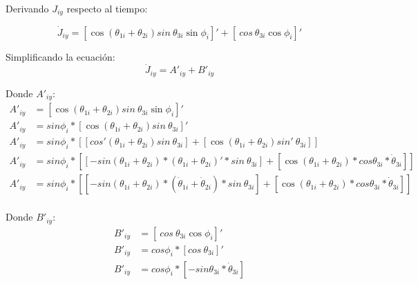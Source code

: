             
            Derivando  $J_{iy}$ respecto al tiempo:

            \begin{equation*}
                  \dot{J}_{iy}= \left[ \cos  \left(  \theta _{1i}+ \theta _{2i} \right) sin~ \theta _{3i}\sin  \phi _{i} \right] '+ \left[ ~cos~ \theta _{3i}\cos  \phi_{i} \right] ' 
            \end{equation*}
            
            Simplificando la ecuación:
            \begin{equation*}
                \dot{J}_{iy}=A'_{iy}+B'_{iy}  
            \end{equation*}
            
            Donde $A'_{iy}$:
            \begin{align*}
                 A'_{iy}&= \left[ \cos  \left(  \theta _{1i}+ \theta _{2i} \right) sin~ \theta _{3i}\sin  \phi _{i} \right] ' \\
                 A'_{iy}&=sin \phi _{i}\ast \left[ \cos  \left(  \theta _{1i}+ \theta _{2i} \right) sin~ \theta _{3i} \right] ' \\
                 A'_{iy}&=sin \phi _{i}\ast \left[  \left[ cos' \left(  \theta _{1i}+ \theta _{2i} \right) sin~ \theta _{3i} \right] + \left[ \cos  \left(  \theta _{1i}+ \theta _{2i} \right) sin'~ \theta _{3i} \right]  \right]  \\
                 A'_{iy}&=sin \phi _{i}\ast \left[  \left[ -sin \left(  \theta _{1i}+ \theta _{2i} \right) \ast \left(  \theta _{1i}+ \theta _{2i} \right) '\ast sin~ \theta _{3i} \right] + \left[ \cos  \left(  \theta _{1i}+ \theta _{2i} \right) \ast cos  \theta _{3i}\ast\dot{ \theta }_{3i} \right]  \right] \\
                 A'_{iy}&=sin \phi _{i}\ast \left[  \left[ -sin \left(  \theta _{1i}+ \theta _{2i} \right) \ast \left( \dot{ \theta }_{1i}+\dot{ \theta }_{2i} \right) \ast sin~ \theta _{3i} \right] + \left[ \cos  \left(  \theta _{1i}+ \theta _{2i} \right) \ast cos  \theta _{3i}\ast\dot{ \theta }_{3i} \right]  \right]  \\                               
            \end{align*}
            
            Donde  $B'_{iy}$:
            \begin{align*}
                 B'_{iy}&= \left[ ~cos~ \theta _{3i}\cos  \phi _{i} \right] ' \\
                 B'_{iy}&=cos \phi _{i}\ast \left[ cos~ \theta _{3i} \right] ' \\
                 B'_{iy}&=cos \phi _{i}\ast \left[ -sin  \theta _{3i}\ast\dot{ \theta }_{3i} \right]
            \end{align*}

